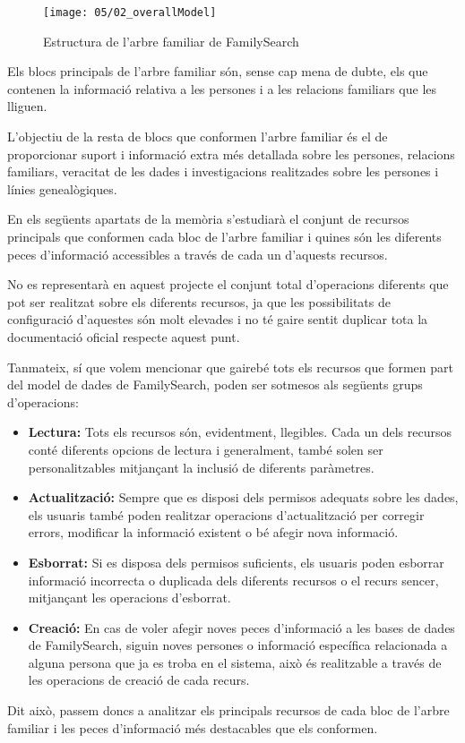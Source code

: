     \begin{figure}[h]
        \texttt{[image: 05/02\_overallModel]}
        \centering
        \caption{Estructura de l'arbre familiar de FamilySearch}\label{fig:familyTree}
    \end{figure}

    Els blocs principals de l'arbre familiar són, sense cap mena de dubte, els que contenen la informació relativa a les persones i a les relacions familiars que les lliguen.

    L’objectiu de la resta de blocs que conformen l'arbre familiar és el de proporcionar suport i informació extra més detallada sobre les persones, relacions familiars, ve\-ra\-ci\-tat de les dades i investigacions realitzades sobre les persones i línies genealògiques.

    En els següents apartats de la memòria s'estudiarà el conjunt de recursos principals que conformen cada bloc de l'arbre familiar i quines són les diferents peces d'informació accessibles a través de cada un d'aquests recursos.

    No es representarà en aquest projecte el conjunt total d'operacions diferents que pot ser realitzat sobre els diferents recursos, ja que les possibilitats de configuració d'aquestes són molt elevades i no té gaire sentit duplicar tota la documentació oficial respecte aquest punt.

    Tanmateix, sí que volem mencionar que gairebé tots els recursos que formen part del model de dades de FamilySearch, poden ser sotmesos als següents grups d'operacions:

    \begin{itemize}
        \item \textbf{Lectura:} Tots els recursos són, evidentment, llegibles. Cada un dels recursos conté diferents opcions de lectura i generalment, també solen ser per\-so\-na\-lit\-za\-bles mitjançant la inclusió de diferents paràmetres.
        \item \textbf{Actualització:} Sempre que es disposi dels permisos adequats sobre les dades, els usuaris també poden realitzar operacions d'actualització per corregir errors, modificar la informació existent o bé afegir nova informació.
        \item \textbf{Esborrat:} Si es disposa dels permisos suficients, els usuaris poden esborrar informació incorrecta o duplicada dels diferents recursos o el recurs sencer, mitjançant les operacions d'esborrat.
        \item \textbf{Creació:} En cas de voler afegir noves peces d'informació a les bases de dades de FamilySearch, siguin noves persones o informació específica relacionada a alguna persona que ja es troba en el sistema, això és realitzable a través de les operacions de creació de cada recurs.
    \end{itemize}

    Dit això, passem doncs a analitzar els principals recursos de cada bloc de l'arbre familiar i les peces d'informació més destacables que els conformen.
